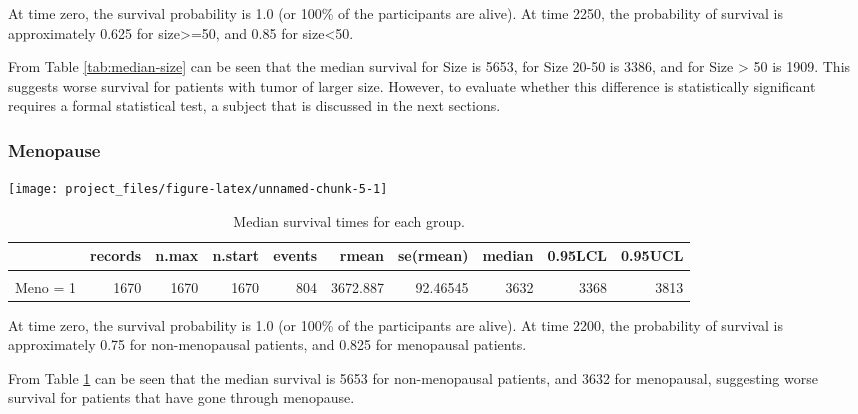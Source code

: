 \documentclass[
]{article}
\begin{document}
At time zero, the survival probability is 1.0 (or 100\% of the participants are alive). At time 2250, the probability of survival is approximately 0.625 for size\textgreater=50, and 0.85 for size\textless50.

From Table \ref{tab:median-size} can be seen that the median survival for Size  is 5653, for Size 20-50 is 3386, and for Size \textgreater{} 50 is 1909. This suggests worse survival for patients with tumor of larger size. However, to evaluate whether this difference is statistically significant requires a formal statistical test, a subject that is discussed in the next sections.

\subsubsection{Menopause}

\begin{center}\texttt{[image: project\_files/figure-latex/unnamed-chunk-5-1]} \end{center}

\begin{table}[!h]

\caption{\label{tab:median-meno}Median survival times for each group.}
\centering
\fontsize{8}{10}\selectfont
\begin{tabular}[t]{lrrrrrrrrr}
\toprule
  & records & n.max & n.start & events & rmean & se(rmean) & median & 0.95LCL & 0.95UCL\\
\midrule
\cellcolor{gray!6}{Meno = 0} & \cellcolor{gray!6}{1312} & \cellcolor{gray!6}{1312} & \cellcolor{gray!6}{1312} & \cellcolor{gray!6}{468} & \cellcolor{gray!6}{4622.427} & \cellcolor{gray!6}{108.80722} & \cellcolor{gray!6}{5653} & \cellcolor{gray!6}{4983} & \cellcolor{gray!6}{}\\
Meno = 1 & 1670 & 1670 & 1670 & 804 & 3672.887 & 92.46545 & 3632 & 3368 & 3813\\
\bottomrule
\end{tabular}
\end{table}

At time zero, the survival probability is 1.0 (or 100\% of the
participants are alive). At time 2200, the probability of survival is
approximately 0.75 for non-menopausal patients, and 0.825 for
menopausal patients.

From Table \ref{tab:median-meno} can be seen that the median survival is 5653 for non-menopausal patients, and 3632 for menopausal, suggesting worse survival for patients that have gone through
menopause.
\end{document}
